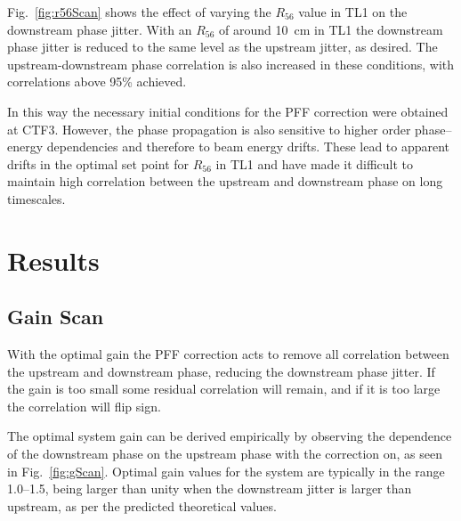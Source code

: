 \documentclass[%
 reprint,
 amsmath,amssymb,
 prl,
]{revtex4-1}
\begin{document}
Fig.~\ref{fig:r56Scan} shows the effect of varying the \(R_{56}\) value in TL1 
on the downstream phase jitter. With an \(R_{56}\) of around 10~cm in TL1 the 
downstream phase jitter is reduced to the same level as the upstream jitter, as 
desired. The upstream-downstream phase correlation is also increased in these 
conditions, with correlations above 95\% achieved.

In this way the necessary initial conditions for the PFF correction were 
obtained at CTF3. However, the phase propagation is also sensitive to higher 
order phase--energy dependencies and therefore to beam energy drifts. These 
lead 
to apparent drifts in the optimal set point for \(R_{56}\) in TL1 and have made 
it difficult to maintain high correlation between the upstream and downstream 
phase on long timescales.

\section{\label{s:results}Results}

\subsection{\label{ss:gScan}Gain Scan}

With the optimal gain the PFF correction acts to remove all correlation between 
the upstream and downstream phase, reducing the downstream phase jitter. If the 
gain is too small some residual correlation will remain, and if it is too large 
the correlation will flip sign. 

The optimal system gain can be derived empirically by observing the dependence 
of the downstream phase on the upstream phase with the correction on, as seen 
in Fig.~\ref{fig:gScan}. Optimal gain values for the system are typically in 
the range 1.0--1.5, being larger than unity when the downstream jitter is 
larger than upstream, as per the predicted theoretical values. 
\end{document}

